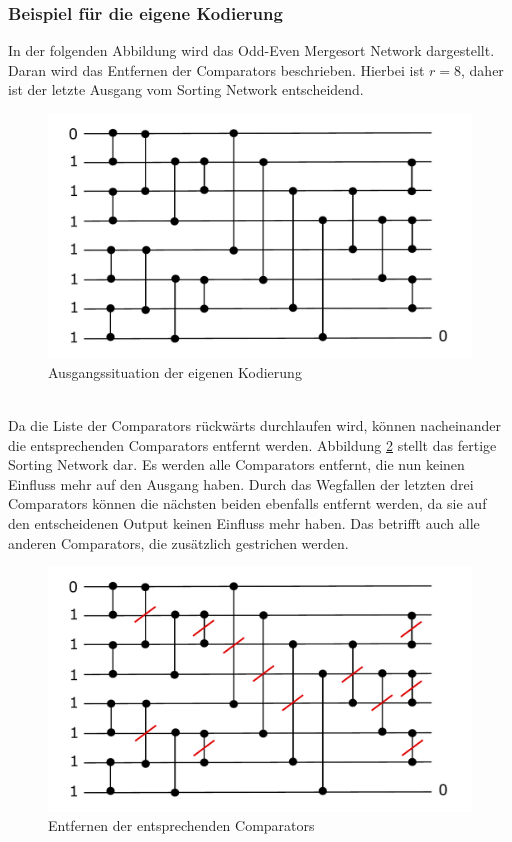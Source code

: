 \documentclass[a4,abstract=on]{scrartcl}
\begin{document}
\subsubsection*{Beispiel für die eigene Kodierung}
In der folgenden Abbildung wird das Odd-Even Mergesort Network dargestellt. Daran wird das Entfernen der Comparators beschrieben. Hierbei ist $r=8$, daher ist der letzte Ausgang vom Sorting Network entscheidend.

\begin{figure}[H]
\centering
\includegraphics[width=\textwidth]{own_sorting_start.pdf}
\caption{Ausgangssituation der eigenen Kodierung}
\label{fig:ownSorting}
\end{figure}
\ \\
Da die Liste der Comparators rückwärts durchlaufen wird, können nacheinander die entsprechenden Comparators entfernt werden. Abbildung \ref{fig:ownSorting1} stellt das fertige Sorting Network dar. Es werden alle Comparators entfernt, die nun keinen Einfluss mehr auf den Ausgang haben. Durch das Wegfallen der letzten drei Comparators können die nächsten beiden ebenfalls entfernt werden, da sie auf den entscheidenen Output keinen Einfluss mehr haben. Das betrifft auch alle anderen Comparators, die zusätzlich gestrichen werden. 

\begin{figure}[H]
\centering
\includegraphics[width=\textwidth]{ownSorting_2.pdf}
\caption{Entfernen der entsprechenden Comparators}
\label{fig:ownSorting1}
\end{figure}
\end{document}
